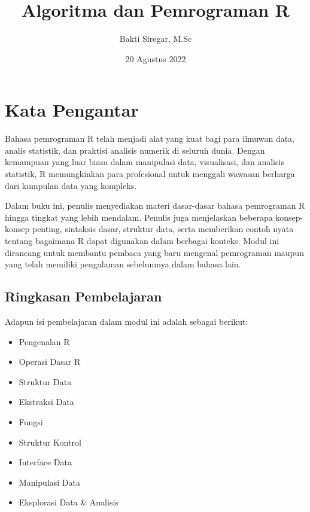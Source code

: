 \documentclass[
]{book}
\title{Algoritma dan Pemrograman R}
\author{Bakti Siregar, M.Sc}
\date{20 Agustus 2022}
\providecommand{\tightlist}{%
  \setlength{\itemsep}{0pt}\setlength{\parskip}{0pt}}
\begin{document}
\maketitle

{
\setcounter{tocdepth}{1}
\tableofcontents
}
\hypertarget{kata-pengantar}{%
\chapter*{Kata Pengantar}\label{kata-pengantar}}

Bahasa pemrograman R telah menjadi alat yang kuat bagi para ilmuwan data, analis statistik, dan praktisi analisis numerik di seluruh dunia. Dengan kemampuan yang luar biasa dalam manipulasi data, visualisasi, dan analisis statistik, R memungkinkan para profesional untuk menggali wawasan berharga dari kumpulan data yang kompleks.

Dalam buku ini, penulis menyediakan materi dasar-dasar bahasa pemrograman R hingga tingkat yang lebih mendalam. Penulis juga menjelaskan beberapa konsep-konsep penting, sintaksis dasar, struktur data, serta memberikan contoh nyata tentang bagaimana R dapat digunakan dalam berbagai konteks. Modul ini dirancang untuk membantu pembaca yang baru mengenal pemrograman maupun yang telah memiliki pengalaman sebelumnya dalam bahasa lain.

\hypertarget{ringkasan-pembelajaran}{%
\section*{Ringkasan Pembelajaran}\label{ringkasan-pembelajaran}}

Adapun isi pembelajaran dalam modul ini adalah sebagai berikut:

\begin{itemize}
\tightlist
\item
  Pengenalan R
\item
  Operasi Dasar R
\item
  Struktur Data
\item
  Ekstraksi Data
\item
  Fungsi
\item
  Struktur Kontrol
\item
  Interface Data
\item
  Manipulasi Data
\item
  Eksplorasi Data \& Analisis
\end{itemize}
\end{document}
